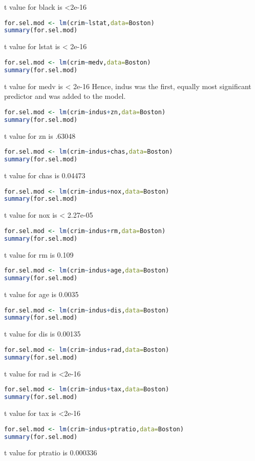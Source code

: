 \documentclass[11pt]{report}
\begin{document}
\begin{itemize}
t value for black is <2e-16
\begin{lstlisting}[language=R]
for.sel.mod <- lm(crim~lstat,data=Boston)
summary(for.sel.mod)
\end{lstlisting}
t value for lstat is < 2e-16
\begin{lstlisting}[language=R]
for.sel.mod <- lm(crim~medv,data=Boston)
summary(for.sel.mod)
\end{lstlisting}
t value for medv is < 2e-16
Hence, indus was the first, equally most significant predictor and was added to the model.
\begin{lstlisting}[language=R]
for.sel.mod <- lm(crim~indus+zn,data=Boston)
summary(for.sel.mod)
\end{lstlisting}
t value for zn is .63048
\begin{lstlisting}[language=R]
for.sel.mod <- lm(crim~indus+chas,data=Boston)
summary(for.sel.mod)
\end{lstlisting}
t value for chas is 0.04473
\begin{lstlisting}[language=R]
for.sel.mod <- lm(crim~indus+nox,data=Boston)
summary(for.sel.mod)
\end{lstlisting}
t value for nox is < 2.27e-05
\begin{lstlisting}[language=R]
for.sel.mod <- lm(crim~indus+rm,data=Boston)
summary(for.sel.mod)
\end{lstlisting}
t value for rm is 0.109
\begin{lstlisting}[language=R]
for.sel.mod <- lm(crim~indus+age,data=Boston)
summary(for.sel.mod)
\end{lstlisting}
t value for age is 0.0035
\begin{lstlisting}[language=R]
for.sel.mod <- lm(crim~indus+dis,data=Boston)
summary(for.sel.mod)
\end{lstlisting}
t value for dis is 0.00135
\begin{lstlisting}[language=R]
for.sel.mod <- lm(crim~indus+rad,data=Boston)
summary(for.sel.mod)
\end{lstlisting}
t value for rad is <2e-16
\begin{lstlisting}[language=R]
for.sel.mod <- lm(crim~indus+tax,data=Boston)
summary(for.sel.mod)
\end{lstlisting}
t value for tax is <2e-16
\begin{lstlisting}[language=R]
for.sel.mod <- lm(crim~indus+ptratio,data=Boston)
summary(for.sel.mod)
\end{lstlisting}
t value for ptratio is 0.000336
\begin{lstlisting}[language=R]

\end{lstlisting}
\end{itemize}
\end{document}
